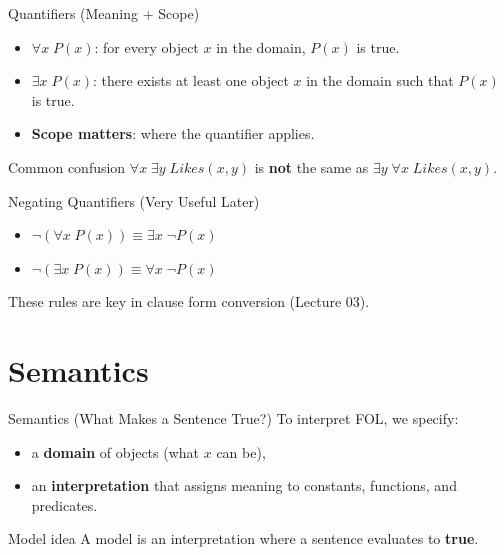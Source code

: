 \documentclass[aspectratio=169]{beamer}
\begin{document}
\begin{frame}{Quantifiers (Meaning + Scope)}
  \begin{itemize}[<+->]
    \item $\forall x\; P(x)$: for every object $x$ in the domain, $P(x)$ is true.
    \item $\exists x\; P(x)$: there exists at least one object $x$ in the domain such that $P(x)$ is true.
    \item \textbf{Scope matters}: where the quantifier applies.
  \end{itemize}
  \vspace{0.4em}
  \begin{exampleblock}{Common confusion}
    $\forall x\; \exists y\; Likes(x,y)$ is \textbf{not} the same as $\exists y\; \forall x\; Likes(x,y)$.
  \end{exampleblock}
\end{frame}

\begin{frame}{Negating Quantifiers (Very Useful Later)}
  \begin{itemize}[<+->]
    \item $\lnot(\forall x\; P(x)) \equiv \exists x\; \lnot P(x)$
    \item $\lnot(\exists x\; P(x)) \equiv \forall x\; \lnot P(x)$
  \end{itemize}
  \vspace{0.4em}
  These rules are key in clause form conversion (Lecture 03).
\end{frame}

\section{Semantics}
\label{sec:sem}

\begin{frame}{Semantics (What Makes a Sentence True?)}
  To interpret FOL, we specify:
  \begin{itemize}[<+->]
    \item a \textbf{domain} of objects (what $x$ can be),
    \item an \textbf{interpretation} that assigns meaning to constants, functions, and predicates.
  \end{itemize}
  \vspace{0.4em}
  \begin{block}{Model idea}
    A model is an interpretation where a sentence evaluates to \textbf{true}.
  \end{block}
\end{frame}
\end{document}
